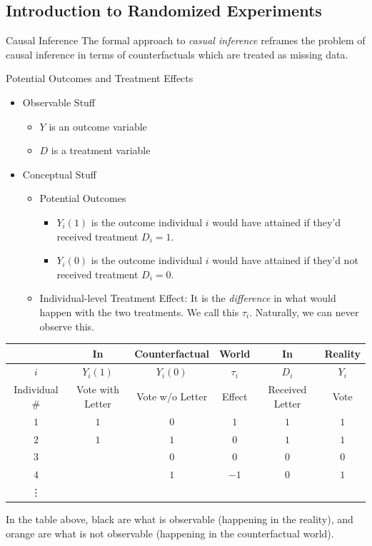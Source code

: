 \subsection{Introduction to Randomized Experiments}
\begin{df}{Causal Inference}
	The formal approach to \textit{casual inference} reframes the problem of causal inference in terms of counterfactuals which are treated as missing data. 
\end{df}
\begin{nota} Potential Outcomes and Treatment Effects
\begin{itemize}
	\item Observable Stuff
	\begin{itemize}
		\item $Y$ is an outcome variable
		\item $D$ is a treatment variable
	\end{itemize}
	\item Conceptual Stuff
	\begin{itemize}
		\item Potential Outcomes
		\begin{itemize}
			\item $Y_i(1)$ is the outcome individual $i$ would have attained if they'd received treatment $D_i=1$.
			\item $Y_i(0)$ is the outcome individual $i$ would have attained if they'd not received treatment $D_i=0$.
		\end{itemize}
		\item Individual-level Treatment Effect: It is the \emph{difference} in what would happen with the two treatments. We call this $\tau_i$. Naturally, we can never observe this.
	\end{itemize}
\end{itemize}
\end{nota}
\begin{eg}{}
	\begin{center}
		\begin{tabular}{c|ccc|cc}
			& In & Counterfactual & World & In & Reality \\
			\hline
			$i$ & $Y_i(1)$ & $Y_i(0)$ & $\tau_i$ & $D_i$ & $Y_i$\\
			Individual \# & Vote with Letter& Vote w/o Letter & Effect & Received Letter & Vote\\
			\hline
			$1$ & $1$ & {\color{orange}$0$} & {\color{orange}$1$} & $1$ & $1$\\
			$2$ & $1$ & {\color{orange}$1$} & {\color{orange}$0$} & $1$ & $1$\\
			$3$ & {\color{orange}{$0$}} & $0$ & {\color{orange}$0$} & $0$ & $0$\\
			$4$ & {\color{orange}{$0$}} & $1$ & {\color{orange}$-1$} & $0$ & $1$\\
			\vdots
		\end{tabular}
	\end{center}
	In the table above, black are what is observable (happening in the reality), and orange are what is not observable (happening in the counterfactual world). 
\end{eg}
